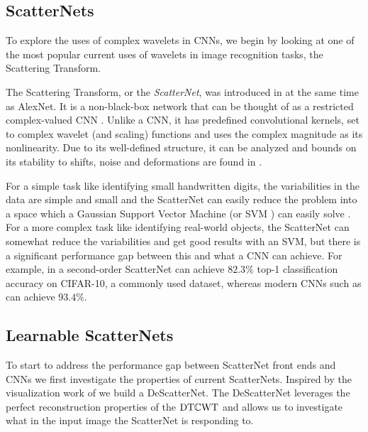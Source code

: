 \subsection{ScatterNets}
To explore the uses of complex wavelets in CNNs, we begin by looking at one of the most
popular current uses of wavelets in image recognition tasks, the
Scattering Transform.

The Scattering Transform, or the \emph{ScatterNet}, was introduced in \cite{mallat_group_2012,
bruna_invariant_2013} at the same time as AlexNet. It is a non-black-box
network that can be thought of as a restricted complex-valued CNN
\cite{tygert_mathematical_2016}. Unlike a CNN, it has predefined
convolutional kernels, set to complex wavelet (and scaling) functions and uses
the complex magnitude as its nonlinearity. Due to
its well-defined structure, it can be analyzed and bounds on its stability to
shifts, noise and deformations are found in \cite{mallat_group_2012}.
%

For a simple task like identifying small handwritten digits,
the variabilities in the data are simple and small and the ScatterNet can easily
reduce the problem into a space which a Gaussian Support Vector Machine (or SVM
\cite{cortes_support-vector_1995}) can easily solve
\cite{bruna_invariant_2013}. For a more complex task like identifying real-world
objects, the ScatterNet can somewhat reduce the variabilities and get good
results with an SVM, but there is a significant performance gap between this and
what a CNN can achieve. For example, in \cite{oyallon_deep_2015} a second-order
ScatterNet can achieve $82.3\%$ top-1 classification accuracy on CIFAR-10, a
commonly used dataset, whereas modern CNNs such as \cite{he_deep_2016} can
achieve $93.4\%$.

\subsection{Learnable ScatterNets}
To start to address the performance gap between ScatterNet front ends and CNNs
we first investigate the properties of current ScatterNets. Inspired by the
visualization work of \citeauthor{zeiler_visualizing_2014}
\cite{zeiler_visualizing_2014} we build a DeScatterNet. The DeScatterNet
leverages the perfect reconstruction properties of the $\mathrm{DT}\mathbb{C}\mathrm{WT}$ and allows us to
investigate what in the input image the ScatterNet is responding to.

